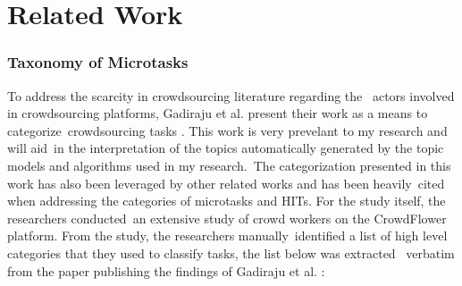 \documentclass[letterpaper,12pt]{article}
\begin{document}
\chapter{Related Work}

\subsection{Taxonomy of Microtasks} To address the scarcity in crowdsourcing literature regarding the \
actors involved in crowdsourcing platforms, Gadiraju et al. present their work as a means to categorize\
crowdsourcing tasks \cite{gadiraju2014taxonomy}. This work is very prevelant to my research and will aid\
in the interpretation of the topics automatically generated by the topic models and algorithms used in my research.\
The categorization presented in this work has also been leveraged by other related works and has been heavily\
cited when addressing the categories of microtasks and HITs. For the study itself, the researchers conducted\
an extensive study of crowd workers on the CrowdFlower platform. From the study, the researchers manually\
identified a list of high level categories that they used to classify tasks, the list below was extracted \
verbatim from the paper publishing the findings of Gadiraju et al. \cite{gadiraju2014taxonomy}: 
\end{document}
